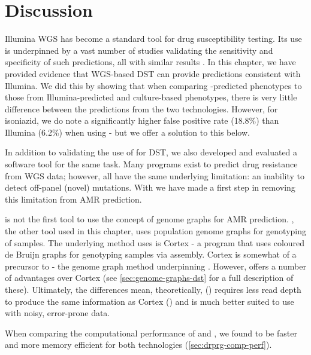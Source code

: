 \section{Discussion}
Illumina WGS has become a standard tool for \mtb{} drug susceptibility testing. Its use is underpinned by a vast number of studies validating the sensitivity and specificity of such predictions, all with similar results \cite{cryptic2018,hunt2019,bradley2015,coll2015,walker2015,kohl2018,phelan2019}. In this chapter, we have provided evidence that \ont{} WGS-based DST can provide predictions consistent with Illumina. We did this by showing that when comparing \ont{}-predicted phenotypes to those from Illumina-predicted and culture-based phenotypes, there is very little difference between the predictions from the two technologies. However, for isoniazid, we do note a significantly higher \ont{} false positive rate (18.8\%) than Illumina (6.2\%) when using \mykrobe{} - but we offer a solution to this below.

In addition to validating the use of \ont{} for DST, we also developed and evaluated a software tool \drprg{} for the same task. Many programs exist to predict drug resistance from WGS data; however, all have the same underlying limitation: an inability to detect off-panel (novel) mutations. With \drprg{} we have made a first step in removing this limitation from \mtb{} AMR prediction.

\drprg{} is not the first tool to use the concept of genome graphs for AMR prediction. \mykrobe{}, the other tool used in this chapter, uses population genome graphs for genotyping of samples. The underlying method \mykrobe{} uses is Cortex \cite{iqbal2012} - a program that uses coloured de Bruijn graphs for genotyping samples via \denovo{} assembly. Cortex is somewhat of a precursor to \pandora{} - the genome graph method underpinning \drprg{}. However, \pandora{} offers a number of advantages over Cortex (see \autoref{sec:genome-graphs-dst} for a full description of these). Ultimately, the differences mean, theoretically, \pandora{} (\drprg{}) requires less read depth to produce the same information as Cortex (\mykrobe{}) and is much better suited to use with noisy, error-prone \ont{} data. 

When comparing the computational performance of \mykrobe{} and \drprg{}, we found \drprg{} to be faster and more memory efficient for both technologies (\autoref{sec:drprg-comp-perf}).

